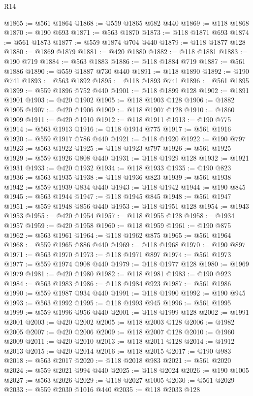 \begin{lexlean}{R14}
\begin{coremodule}
@1865 := @561 @1864
@1868 := @559 @1865 @682 @440
@1869 := @118 @1868
@1870 := @190 @693
@1871 := @563 @1870
@1873 := @118 @1871 @693
@1874 := @561 @1873
@1877 := @559 @1874 @704 @440
@1879 := @118 @1877 @128
@1880 := @1869 @1879
@1881 := @420 @1880
@1882 := @118 @1881
@1883 := @190 @719
@1884 := @563 @1883
@1886 := @118 @1884 @719
@1887 := @561 @1886
@1890 := @559 @1887 @730 @440
@1891 := @118 @1890
@1892 := @190 @741
@1893 := @563 @1892
@1895 := @118 @1893 @741
@1896 := @561 @1895
@1899 := @559 @1896 @752 @440
@1901 := @118 @1899 @128
@1902 := @1891 @1901
@1903 := @420 @1902
@1905 := @118 @1903 @128
@1906 := @1882 @1905
@1907 := @420 @1906
@1909 := @118 @1907 @128
@1910 := @1860 @1909
@1911 := @420 @1910
@1912 := @118 @1911
@1913 := @190 @775
@1914 := @563 @1913
@1916 := @118 @1914 @775
@1917 := @561 @1916
@1920 := @559 @1917 @786 @440
@1921 := @118 @1920
@1922 := @190 @797
@1923 := @563 @1922
@1925 := @118 @1923 @797
@1926 := @561 @1925
@1929 := @559 @1926 @808 @440
@1931 := @118 @1929 @128
@1932 := @1921 @1931
@1933 := @420 @1932
@1934 := @118 @1933
@1935 := @190 @823
@1936 := @563 @1935
@1938 := @118 @1936 @823
@1939 := @561 @1938
@1942 := @559 @1939 @834 @440
@1943 := @118 @1942
@1944 := @190 @845
@1945 := @563 @1944
@1947 := @118 @1945 @845
@1948 := @561 @1947
@1951 := @559 @1948 @856 @440
@1953 := @118 @1951 @128
@1954 := @1943 @1953
@1955 := @420 @1954
@1957 := @118 @1955 @128
@1958 := @1934 @1957
@1959 := @420 @1958
@1960 := @118 @1959
@1961 := @190 @875
@1962 := @563 @1961
@1964 := @118 @1962 @875
@1965 := @561 @1964
@1968 := @559 @1965 @886 @440
@1969 := @118 @1968
@1970 := @190 @897
@1971 := @563 @1970
@1973 := @118 @1971 @897
@1974 := @561 @1973
@1977 := @559 @1974 @908 @440
@1979 := @118 @1977 @128
@1980 := @1969 @1979
@1981 := @420 @1980
@1982 := @118 @1981
@1983 := @190 @923
@1984 := @563 @1983
@1986 := @118 @1984 @923
@1987 := @561 @1986
@1990 := @559 @1987 @934 @440
@1991 := @118 @1990
@1992 := @190 @945
@1993 := @563 @1992
@1995 := @118 @1993 @945
@1996 := @561 @1995
@1999 := @559 @1996 @956 @440
@2001 := @118 @1999 @128
@2002 := @1991 @2001
@2003 := @420 @2002
@2005 := @118 @2003 @128
@2006 := @1982 @2005
@2007 := @420 @2006
@2009 := @118 @2007 @128
@2010 := @1960 @2009
@2011 := @420 @2010
@2013 := @118 @2011 @128
@2014 := @1912 @2013
@2015 := @420 @2014
@2016 := @118 @2015
@2017 := @190 @983
@2018 := @563 @2017
@2020 := @118 @2018 @983
@2021 := @561 @2020
@2024 := @559 @2021 @994 @440
@2025 := @118 @2024
@2026 := @190 @1005
@2027 := @563 @2026
@2029 := @118 @2027 @1005
@2030 := @561 @2029
@2033 := @559 @2030 @1016 @440
@2035 := @118 @2033 @128

\end{coremodule}
\end{lexlean}
